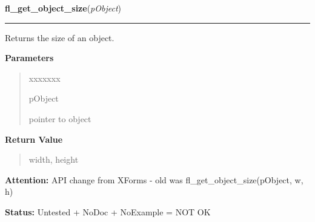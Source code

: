 \hspace{.8\funcindent}\begin{boxedminipage}{\funcwidth}

    \raggedright \textbf{fl\_get\_object\_size}(\textit{pObject})

    \vspace{-1.5ex}

    \rule{\textwidth}{0.5\fboxrule}
\setlength{\parskip}{2ex}
    Returns the size of an object.

\setlength{\parskip}{1ex}
      \textbf{Parameters}
      \vspace{-1ex}

      \begin{quote}
        \begin{Ventry}{xxxxxxx}

          \item[pObject]

          pointer to object

        \end{Ventry}

      \end{quote}

      \textbf{Return Value}
    \vspace{-1ex}

      \begin{quote}
      width, height

      \end{quote}

\textbf{Attention:} API change from XForms - old was fl\_get\_object\_size(pObject, w, h)



\textbf{Status:} Untested + NoDoc + NoExample = NOT OK



    \end{boxedminipage}

    \label{xformslib:library:fl_set_object_size}

    \vspace{0.5ex}

